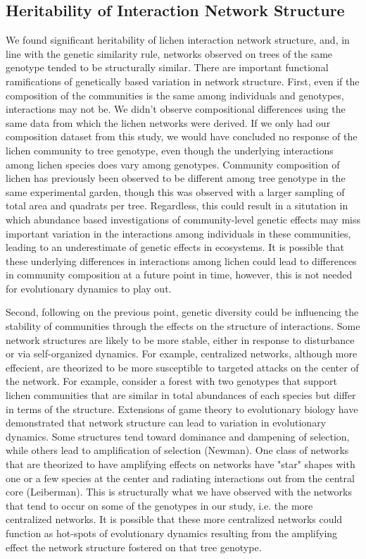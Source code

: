 \documentclass[11pt,twocolumn,twoside,lineno]{pnas-new}
\begin{document}
\subsection*{Heritability of Interaction Network Structure}

We found significant heritability of lichen interaction network
structure, and, in line with the genetic similarity rule, networks
observed on trees of the same genotype tended to be structurally
similar. There are important functional ramifications of genetically
based variation in network structure. First, even if the composition
of the communities is the same among individuals and genotypes,
interactions may not be. We didn't observe compositional differences
using the same data from which the lichen networks were derived. If we
only had our composition dataset from this study, we would have
concluded no response of the lichen community to tree genotype, even
though the underlying interactions among lichen species does vary
among genotypes. Community composition of lichen has previously been
observed to be different among tree genotype in the same experimental
garden, though this was observed with a larger sampling of total area
and quadrats per tree. Regardless, this could result in a situtation
in which abundance based investigations of community-level genetic
effects may miss important variation in the interactions among
individuals in these communities, leading to an underestimate of
genetic effects in ecosystems. It is possible that these underlying
differences in interactions among lichen could lead to differences in
community composition at a future point in time, however, this is not
needed for evolutionary dynamics to play out.

Second, following on the previous point, genetic diversity could be
influencing the stability of communities through the effects on the
structure of interactions. Some network structures are likely to be
more stable, either in response to disturbance or via self-organized
dynamics. For example, centralized networks, although more effecient,
are theorized to be more susceptible to targeted attacks on the center
of the network. For example, consider a forest with two genotypes that
support lichen communities that are similar in total abundances of
each species but differ in terms of the structure. Extensions of game
theory to evolutionary biology have demonstrated that network
structure can lead to variation in evolutionary dynamics. Some
structures tend toward dominance and dampening of selection, while
others lead to amplification of selection (Newman). One class of
networks that are theorized to have amplifying effects on networks
have "star" shapes with one or a few species at the center and
radiating interactions out from the central core (Leiberman). This is
structurally what we have observed with the networks that tend to
occur on some of the genotypes in our study, i.e. the more centralized
networks. It is possible that these more centralized networks could
function as hot-spots of evolutionary dynamics resulting from the
amplifying effect the network structure fostered on that tree
genotype.
\end{document}
